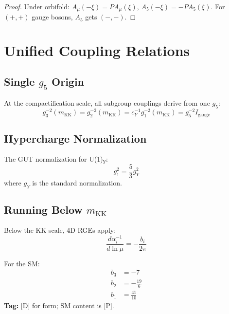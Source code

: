 \documentclass[11pt,a4paper]{article}
\begin{document}
\begin{proof}
Under orbifold: $A_\mu(-\xi) = P A_\mu(\xi)$, $A_5(-\xi) = -P A_5(\xi)$.
For $(+,+)$ gauge bosons, $A_5$ gets $(-,-)$.
\end{proof}

\section{Unified Coupling Relations}
\label{sec:unified-couplings}

\subsection{Single $g_5$ Origin}

At the compactification scale, all subgroup couplings derive from one $g_5$:
\begin{equation}
  g_3^{-2}(m_{\text{KK}}) = g_2^{-2}(m_{\text{KK}}) = c_Y^{-1} g_1^{-2}(m_{\text{KK}})
    = g_5^{-2} I_{\text{gauge}}
  \label{eq:unified-coupling}
\end{equation}

\subsection{Hypercharge Normalization}

The GUT normalization for U(1)$_Y$:
\begin{equation}
  g_1^2 = \frac{5}{3} g_Y^2
  \label{eq:gut-normalization}
\end{equation}
where $g_Y$ is the standard normalization.

\subsection{Running Below $m_{\text{KK}}$}

Below the KK scale, 4D RGEs apply:
\begin{equation}
  \frac{d\alpha_i^{-1}}{d\ln\mu} = -\frac{b_i}{2\pi}
  \label{eq:4d-rge}
\end{equation}

For the SM:
\begin{align}
  b_3 &= -7
  \label{eq:b3} \\
  b_2 &= -\frac{19}{6}
  \label{eq:b2} \\
  b_1 &= \frac{41}{10}
  \label{eq:b1}
\end{align}
\textbf{Tag:} [D] for form; SM content is [P].
\end{document}
